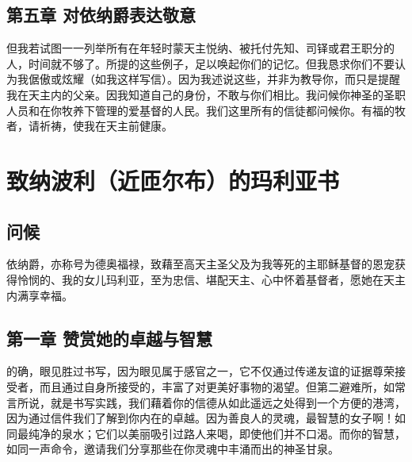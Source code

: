 
\subsection{第五章 对依纳爵表达敬意}

但我若试图一一列举所有在年轻时蒙天主悦纳、被托付先知、司铎或君王职分的人，时间就不够了。所提的这些例子，足以唤起你们的记忆。但我恳求你们不要认为我倨傲或炫耀（如我这样写信）。因为我述说这些，并非为教导你，而只是提醒我在天主内的父亲。因我知道自己的身份，不敢与你们相比。我问候你神圣的圣职人员和在你牧养下管理的爱基督的人民。我们这里所有的信徒都问候你。有福的牧者，请祈祷，使我在天主前健康。\par


\section{致纳波利（近匝尔布）的玛利亚书}


\subsection{问候}

依纳爵，亦称号为德奥福禄，致藉至高天主圣父及为我等死的主耶稣基督的恩宠获得怜悯的、我的女儿玛利亚，至为忠信、堪配天主、心中怀着基督者，愿她在天主内满享幸福。\par


\subsection{第一章 赞赏她的卓越与智慧}

的确，眼见胜过书写，因为眼见属于感官之一，它不仅通过传递友谊的证据尊荣接受者，而且通过自身所接受的，丰富了对更美好事物的渴望。但第二避难所，如常言所说，就是书写实践，我们藉着你的信德从如此遥远之处得到一个方便的港湾，因为通过信件我们了解到你内在的卓越。因为善良人的灵魂，最智慧的女子啊！如同最纯净的泉水；它们以美丽吸引过路人来喝，即使他们并不口渴。而你的智慧，如同一声命令，邀请我们分享那些在你灵魂中丰涌而出的神圣甘泉。\par


